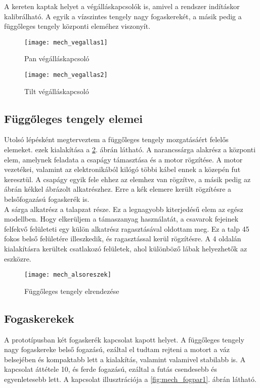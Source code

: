 A kereten kaptak helyet a végálláskapcsolók is, amivel a rendszer indításkor kalibrálható. A egyik a vízszintes tengely nagy fogaskerekét, a másik pedig a függőleges tengely központi eleméhez viszonyít.


\begin{figure}
	\centering
	\begin{minipage}{.5\textwidth}
		\centering
		\texttt{[image: mech\_vegallas1]}
		\caption{Pan végálláskapcsoló}
		\label{fig:mech_vegallas1}
	\end{minipage}%
	\begin{minipage}{.5\textwidth}
		\centering
		\texttt{[image: mech\_vegallas2]}
		\caption{Tilt végálláskapcsoló}
		\label{fig:mech_vegallas2}
	\end{minipage}
\end{figure}

\subsection{Függőleges tengely elemei}

Utolsó lépésként megterveztem a függőleges tengely mozgatásáért felelős elemeket. ezek kialakítása a \ref{fig:mech_alsoreszek}. ábrán látható. A narancssárga alakrész a központi elem, amelynek feladata a csapágy támasztása és a motor rögzítése. A motor vezetékei, valamint az elektronikából kilógó többi kábel ennek a közepén fut keresztül. A csapágy egyik fele ehhez az elemhez van rögzítve, a másik pedig  az ábrán kékkel ábrázolt alkatrészhez. Erre a kék elemere került rögzítésre a belsőfogazású fogaskerék is. \\ 

A sárga alkatrész a talapzat része. Ez a legnagyobb kiterjedésű elem az egész modellben. Hogy elkerüljem a támaszanyag használatát, a csavarok fejeinek felfekvő felületeti egy külön alkatrész ragasztásával oldottam meg. Ez a talp 45 fokos belső felületére illeszkedik, és ragasztással kerül rögzítésre. A 4 oldalán kialakításra kerültek csatlakozó felületek, ahol különböző lábak helyezhetők az eszközre.

\begin{figure}[h!]
	\centering
	\texttt{[image: mech\_alsoreszek]}
	\caption{Függőleges tengely elrendezése}
	\label{fig:mech_alsoreszek}
\end{figure}

\subsection{Fogaskerekek}
A prototípusban két fogaskerék kapcsolat kapott helyet. A függőleges tengely nagy fogaskereke belső fogazású, ezáltal el tudtam rejteni a motort a váz belsejében és kompaktabb lett a kialakítás, valamint valamivel stabilabb is. A kapcsolat áttétele 10, és ferde fogazású, ezáltal a futás csendesebb és egyenletesebb lett. A kapcsolat illusztrációja a \ref{fig:mech_fogpar1}. ábrán látható.

